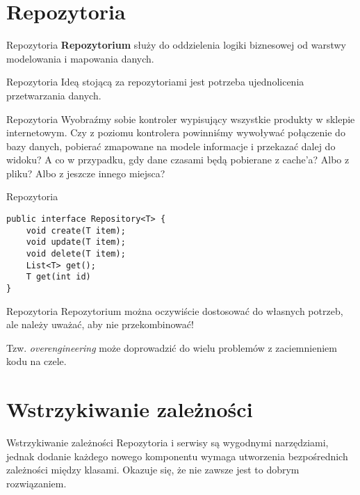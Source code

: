 \section{Repozytoria}

\begin{frame}{Repozytoria}
	\textbf{Repozytorium} służy do oddzielenia logiki biznesowej od warstwy modelowania i mapowania danych.
\end{frame}

\begin{frame}[fragile]{Repozytoria}
	Ideą stojącą za repozytoriami jest potrzeba ujednolicenia przetwarzania danych.
\end{frame}

\begin{frame}[fragile]{Repozytoria}	
	Wyobraźmy sobie kontroler wypisujący wszystkie produkty w sklepie internetowym. Czy z poziomu kontrolera powinniśmy wywoływać połączenie do bazy danych, pobierać zmapowane na modele informacje i przekazać dalej do widoku? A co w przypadku, gdy dane czasami będą pobierane z cache'a? Albo z pliku? Albo z jeszcze innego miejsca?
\end{frame}

\begin{frame}[fragile]{Repozytoria}
	\begin{lstlisting}
public interface Repository<T> {
    void create(T item);
    void update(T item);
    void delete(T item);
    List<T> get();
    T get(int id)
}
	\end{lstlisting}
\end{frame}

\begin{frame}{Repozytoria}
	Repozytorium można oczywiście dostosować do własnych potrzeb, ale należy uważać, aby nie przekombinować!
	
	Tzw. \emph{overengineering} może doprowadzić do wielu problemów z zaciemnieniem kodu na czele.
\end{frame}

\section{Wstrzykiwanie zależności}

\begin{frame}{Wstrzykiwanie zależności}
	Repozytoria i serwisy są wygodnymi narzędziami, jednak dodanie każdego nowego komponentu wymaga utworzenia bezpośrednich zależności między klasami. Okazuje się, że nie zawsze jest to dobrym rozwiązaniem.
\end{frame}

